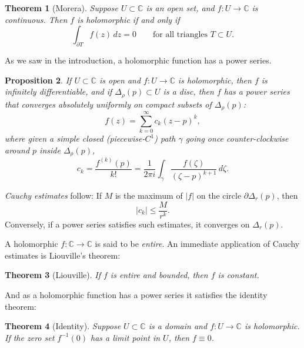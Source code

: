 \documentclass[12pt,openany]{book}
\newcommand{\sabs}[1]{\lvert {#1} \rvert}
\newcommand{\C}{{\mathbb{C}}}
\newcommand{\myindex}[1]{#1\index{#1}}
\theoremstyle{plain}
\newtheorem{thm}{Theorem}[section]
\newtheorem{prop}[thm]{Proposition}
\theoremstyle{remark}
\theoremstyle{definition}
\theoremstyle{exercise}
\theoremstyle{example}
\begin{document}
\begin{thm}[Morera] \label{thm:onevarmorera}
Suppose $U \subset \C$ is an open set, and $f \colon U \to \C$
is continuous.  Then $f$ is holomorphic
if and only if
\begin{equation*}
\int_{\partial T} f(z) \, dz = 0
\qquad
\text{for all triangles } T \subset U.
\end{equation*}
\end{thm}

As we saw in the introduction, a holomorphic function has a power series.

\begin{prop}
If $U \subset \C$ is open and $f \colon U \to \C$ is holomorphic,
then $f$ is infinitely differentiable, and if $\Delta_\rho(p) \subset U$
is a disc, then $f$ has a power series that
converges absolutely uniformly on compact subsets of $\Delta_\rho(p)$:
\begin{equation*}
f(z) = \sum_{k=0}^\infty c_k {(z-p)}^k ,
\end{equation*}
where given a simple closed (piecewise-$C^1$) path $\gamma$
going once counter-clockwise
around $p$ inside $\Delta_\rho(p)$,
\begin{equation*}
c_k = \frac{f^{(k)}(p)}{k!} =
\frac{1}{2\pi i}
\int_{\gamma}
\frac{f(\zeta)}{{(\zeta-p)}^{k+1}}
\,
d \zeta  .
\end{equation*}
\end{prop}

\emph{\myindex{Cauchy estimates}} follow:  If $M$
is the maximum of $\sabs{f}$ on the circle $\partial \Delta_r(p)$, then
\begin{equation*}
\sabs{c_k} \leq \frac{M}{r^k} .
\end{equation*}
Conversely, if a power series satisfies such estimates,
it converges on $\Delta_r(p)$.

A holomorphic $f \colon \C \to \C$ is said to be
\emph{\myindex{entire}}.  An immediate application of Cauchy estimates
is Liouville's theorem:

\begin{thm}[Liouville]
If $f$ is entire and bounded, then $f$ is constant.
\end{thm}

And as a holomorphic function has a power series it satisfies the
identity theorem:

\begin{thm}[Identity] \label{thm:onevaridentity}
Suppose $U \subset \C$ is a domain and $f \colon U \to \C$ is holomorphic.
If the zero set $f^{-1}(0)$ has a limit point in $U$, then
$f \equiv 0$.
\end{thm}
\end{document}
